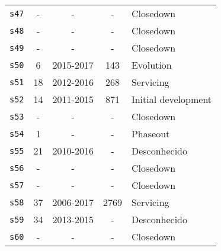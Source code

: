 \begin{longtable}{ l c c c l }
    \texttt{s47} & - & - & - & Closedown \\
    \texttt{s48} & - & - & - & Closedown \\
    \texttt{s49} & - & - & - & Closedown \\
    \texttt{s50} & 6 & 2015-2017 & 143 & Evolution \\
    \texttt{s51} & 18 & 2012-2016 & 268 & Servicing \\
    \texttt{s52} & 14 & 2011-2015 & 871 & Initial development \\
    \texttt{s53} & - & - & - & Closedown \\
    \texttt{s54} & 1 & - & - & Phaseout \\
    \texttt{s55} & 21 & 2010-2016 & - & Desconhecido \\
    \texttt{s56} & - & - & - & Closedown \\
    \texttt{s57} & - & - & - & Closedown \\
    \texttt{s58} & 37 & 2006-2017 & 2769 & Servicing \\
    \texttt{s59} & 34 & 2013-2015 & - & Desconhecido \\
    \texttt{s60} & - & - & - & Closedown \\
\end{longtable}
